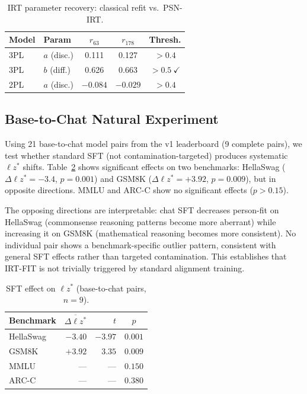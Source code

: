 \documentclass[11pt,a4paper]{article}
\begin{document}
\begin{table}[t]
\centering
\caption{IRT parameter recovery: classical refit vs.\ PSN-IRT.}
\label{tab:refit}
\small
\begin{tabular}{llccc}
\toprule
Model & Param & $r_{63}$ & $r_{178}$ & Thresh. \\
\midrule
3PL & $a$ (disc.) & 0.111 & 0.127 & $>0.4$ \\
3PL & $b$ (diff.) & 0.626 & 0.663 & $>0.5~\checkmark$ \\
2PL & $a$ (disc.) & $-0.084$ & $-0.029$ & $>0.4$ \\
\bottomrule
\end{tabular}
\end{table}

\subsection{Base-to-Chat Natural Experiment}

Using 21 base-to-chat model pairs from the v1 leaderboard (9 complete pairs), we test whether standard SFT (not contamination-targeted) produces systematic $\ell z^*$ shifts. Table~\ref{tab:basechat} shows significant effects on two benchmarks: HellaSwag ($\Delta\ell z^* = -3.4$, $p = 0.001$) and GSM8K ($\Delta\ell z^* = +3.92$, $p = 0.009$), but in opposite directions. MMLU and ARC-C show no significant effects ($p > 0.15$).

The opposing directions are interpretable: chat SFT decreases person-fit on HellaSwag (commonsense reasoning patterns become more aberrant) while increasing it on GSM8K (mathematical reasoning becomes more consistent). No individual pair shows a benchmark-specific outlier pattern, consistent with general SFT effects rather than targeted contamination. This establishes that IRT-FIT is not trivially triggered by standard alignment training.

\begin{table}[t]
\centering
\caption{SFT effect on $\ell z^*$ (base-to-chat pairs, $n=9$).}
\label{tab:basechat}
\small
\begin{tabular}{lrrc}
\toprule
Benchmark & $\overline{\Delta\ell z^*}$ & $t$ & $p$ \\
\midrule
HellaSwag & $-3.40$ & $-3.97$ & $0.001$ \\
GSM8K & $+3.92$ & $3.35$ & $0.009$ \\
MMLU & --- & --- & $0.150$ \\
ARC-C & --- & --- & $0.380$ \\
\bottomrule
\end{tabular}
\end{table}
\end{document}
